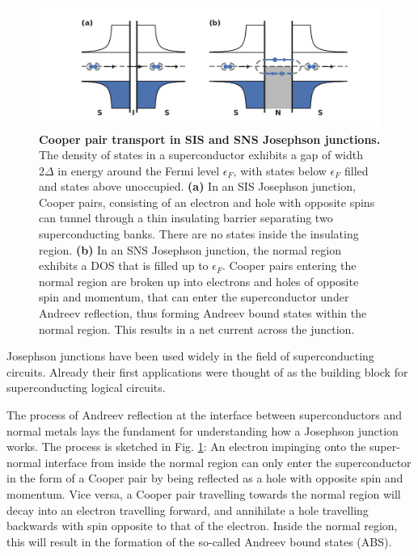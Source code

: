 \begin{figure}[t]
	\centering
	\includegraphics[width=\linewidth]{chapter-introduction/figs/model_SNS_DOS}
	\caption{
		\textbf{Cooper pair transport in SIS and SNS Josephson junctions.}
		The density of states in a superconductor exhibits a gap of width $2\Delta$ in energy around the Fermi level $\epsilon_F$, with states below $\epsilon_F$ filled and states above unoccupied.
		\textbf{(a)} In an SIS Josephson junction, Cooper pairs, consisting of an electron and hole with opposite spins can tunnel through a thin insulating barrier separating two superconducting banks.
		There are no states inside the insulating region.
		\textbf{(b)} In an SNS Josephson junction, the normal region exhibits a DOS that is filled up to $\epsilon_F$.
		Cooper pairs entering the normal region are broken up into electrons and holes of opposite spin and momentum, that can enter the superconductor under Andreev reflection, thus forming Andreev bound states within the normal region.
		This results in a net current across the junction.
	}
	\label{fig:modelsnsdos}
\end{figure}

Josephson junctions have been used widely in the field of superconducting circuits.
%
Already their first applications were thought of as the building block for superconducting logical circuits.

The process of Andreev reflection at the interface between superconductors and normal metals lays the fundament for understanding how a Josephson junction works.
%
The process is sketched in Fig. \ref{fig:modelsnsdos}:
%
An electron impinging onto the super-normal interface from inside the normal region can only enter the superconductor in the form of a Cooper pair by being reflected as a hole with opposite spin and momentum.
%
Vice versa, a Cooper pair travelling towards the normal region will decay into an electron travelling forward, and annihilate a hole travelling backwards with spin opposite to that of the electron.
%
Inside the normal region, this will result in the formation of the so-called Andreev bound states (ABS).

